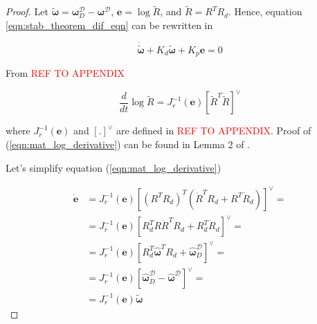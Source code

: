 \begin{proof}
    Let $\tilde{\boldsymbol{\omega}} = \boldsymbol{\omega}_D^{\mathcal{D}} - 
    \boldsymbol{\omega}^{\mathcal{D}}$, $\mathbf{e} = \log \tilde{R}$, 
    and $\tilde{R} = R^T R_d$. Hence, equation 
    \ref{eqn:stab_theorem_dif_eqn} can be rewritten in 

    \begin{equation}
        \dot{\tilde{\boldsymbol{\omega}}}
        + K_d 
        \tilde{\boldsymbol{\omega}}
        + K_p 
        \mathbf{e} = 0
        \label{eqn:stab_theorem_dif_eqn_simple}
    \end{equation}

    From \textcolor{red}{REF TO APPENDIX}

    \begin{equation}
        \frac{d}{dt} \log \tilde{R} 
        = J_r^{-1}(\mathbf{e}) [\tilde{R}^T \dot{\tilde{R}}]^{\vee}
        \label{eqn:mat_log_derivative}
    \end{equation}

    where $J_r^{-1}(\mathbf{e})$ and $[.]^{\vee}$ are defined in 
    \textcolor{red}{REF TO APPENDIX}. Proof of (\ref{eqn:mat_log_derivative}) 
    can be found in Lemma 2 of \cite{ANonlinearObserverUsingPose}.

    Let's simplify equation (\ref{eqn:mat_log_derivative}) 

    \begin{equation}
        \begin{aligned}
            \dot{\mathbf{e}} & = 
            J_r^{-1}(\mathbf{e}) 
            [(R^T R_d)^T (\dot{R}^T R_d + R^T \dot{R}_d)]^{\vee} = \\
            & = J_r^{-1}(\mathbf{e}) 
            [R_d^T R \dot{R}^T R_d + R_d^T \dot{R}_d]^{\vee} = \\
            & = J_r^{-1}(\mathbf{e}) 
            [
                R_d^T \hat{\boldsymbol{\omega}}^T R_d + 
                \hat{\boldsymbol{\omega}}_D^{\mathcal{D}}
            ]^{\vee} = \\ 
            & = J_r^{-1}(\mathbf{e})
            [
                \hat{\boldsymbol{\omega}}_D^{\mathcal{D}} - 
                \hat{\boldsymbol{\omega}}^{\mathcal{D}}
            ]^{\vee} = \\
            & = J_r^{-1}(\mathbf{e}) \tilde{\boldsymbol{\omega}}
        \end{aligned}
        \label{eqn:mat_log_der_simple}
    \end{equation}


\end{proof}
